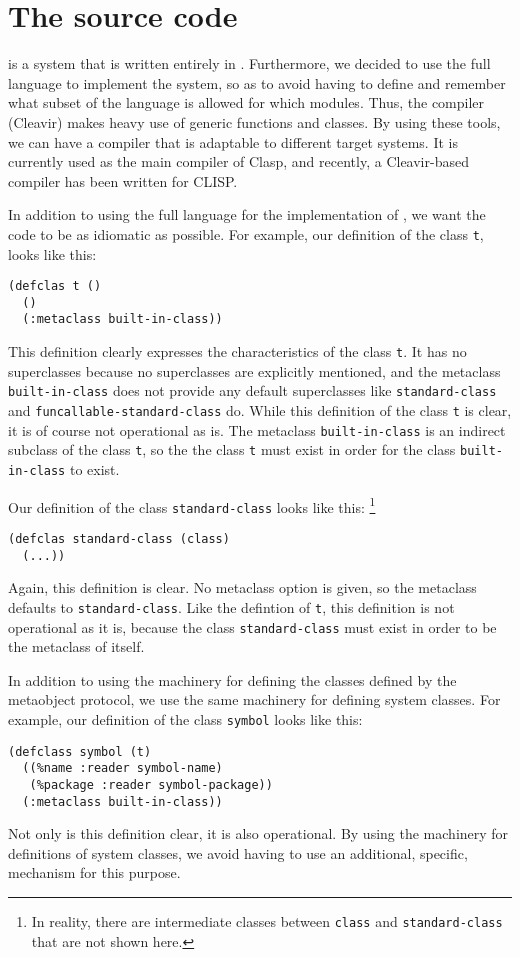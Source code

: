 \section{The \sicl{} source code}

\sicl{} is a system that is written entirely in \commonlisp{}.
Furthermore, we decided to use the full language to implement the
system, so as to avoid having to define and remember what subset of
the language is allowed for which modules.  Thus, the compiler
(Cleavir) makes heavy use of generic functions and classes.  By using
these tools, we can have a compiler that is adaptable to different
target systems.  It is currently used as the main compiler of Clasp,
and recently, a Cleavir-based compiler has been written for CLISP.

In addition to using the full language for the implementation of
\sicl{}, we want the code to be as idiomatic as possible.  For
example, our definition of the class \texttt{t}, looks like this:

\begin{verbatim}
(defclas t ()
  ()
  (:metaclass built-in-class))
\end{verbatim}

This definition clearly expresses the characteristics of the class
\texttt{t}.  It has no superclasses because no superclasses are
explicitly mentioned, and the metaclass \texttt{built-in-class} does
not provide any default superclasses like \texttt{standard-class} and
\texttt{funcallable-standard-class} do.  While this definition of the
class \texttt{t} is clear, it is of course not operational as is.  The
metaclass \texttt{built-in-class} is an indirect subclass of the class
\texttt{t}, so the the class \texttt{t} must exist in order for the
class \texttt{built-in-class} to exist.

Our definition of the class \texttt{standard-class} looks like this:%
\footnote{In reality, there are intermediate classes between
  \texttt{class} and \texttt{standard-class} that are not shown here.}

\begin{verbatim}
(defclas standard-class (class)
  (...))
\end{verbatim}

Again, this definition is clear.  No metaclass option is given, so the
metaclass defaults to \texttt{standard-class}.  Like the defintion of
\texttt{t}, this definition is not operational as it is, because the
class \texttt{standard-class} must exist in order to be the metaclass
of itself.

In addition to using the \clos{} machinery for defining the classes
defined by the metaobject protocol, we use the same machinery for
defining system classes.  For example, our definition of the class
\texttt{symbol} looks like this:

\begin{verbatim}
(defclass symbol (t)
  ((%name :reader symbol-name)
   (%package :reader symbol-package))
  (:metaclass built-in-class))
\end{verbatim}

Not only is this definition clear, it is also operational.  By using
the \clos{} machinery for definitions of system classes, we avoid
having to use an additional, specific, mechanism for this purpose.
